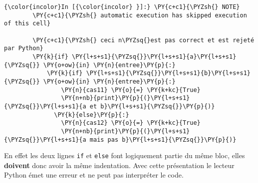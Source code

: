     \begin{Verbatim}[commandchars=\\\{\}]
{\color{incolor}In [{\color{incolor} }]:} \PY{c+c1}{\PYZsh{} NOTE}
        \PY{c+c1}{\PYZsh{} automatic execution has skipped execution of this cell}
        
        \PY{c+c1}{\PYZsh{} ceci n\PYZsq{}est pas correct et est rejeté par Python}
        \PY{k}{if} \PY{l+s+s1}{\PYZsq{}}\PY{l+s+s1}{a}\PY{l+s+s1}{\PYZsq{}} \PY{o+ow}{in} \PY{n}{entree}\PY{p}{:}
            \PY{k}{if} \PY{l+s+s1}{\PYZsq{}}\PY{l+s+s1}{b}\PY{l+s+s1}{\PYZsq{}} \PY{o+ow}{in} \PY{n}{entree}\PY{p}{:}
                \PY{n}{cas11} \PY{o}{=} \PY{k+kc}{True}
                \PY{n+nb}{print}\PY{p}{(}\PY{l+s+s1}{\PYZsq{}}\PY{l+s+s1}{a et b}\PY{l+s+s1}{\PYZsq{}}\PY{p}{)}
              \PY{k}{else}\PY{p}{:}
                \PY{n}{cas12} \PY{o}{=} \PY{k+kc}{True}
                \PY{n+nb}{print}\PY{p}{(}\PY{l+s+s1}{\PYZsq{}}\PY{l+s+s1}{a mais pas b}\PY{l+s+s1}{\PYZsq{}}\PY{p}{)}
\end{Verbatim}


    En effet les deux lignes \texttt{if} et \texttt{else} font logiquement
partie du même bloc, elles \textbf{doivent} donc avoir la même
indentation. Avec cette présentation le lecteur Python émet une erreur
et ne peut pas interpréter le code.


    
    
    
